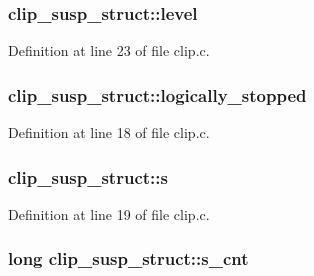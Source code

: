 \subsubsection[{\texorpdfstring{level}{level}}]{ clip\+\_\+susp\+\_\+struct\+::level}\hypertarget{structclip__susp__struct_a6f145bb99356d76153f792440a3794c3}{}\label{structclip__susp__struct_a6f145bb99356d76153f792440a3794c3}


Definition at line 23 of file clip.\+c.

\subsubsection[{\texorpdfstring{logically\+\_\+stopped}{logically_stopped}}]{ clip\+\_\+susp\+\_\+struct\+::logically\+\_\+stopped}\hypertarget{structclip__susp__struct_a777100ae2b579b310ceba48ac325c9b3}{}\label{structclip__susp__struct_a777100ae2b579b310ceba48ac325c9b3}


Definition at line 18 of file clip.\+c.

\subsubsection[{\texorpdfstring{s}{s}}]{ clip\+\_\+susp\+\_\+struct\+::s}\hypertarget{structclip__susp__struct_ac52e61d1e14914a137b1501b59e2c3a1}{}\label{structclip__susp__struct_ac52e61d1e14914a137b1501b59e2c3a1}


Definition at line 19 of file clip.\+c.

\subsubsection[{\texorpdfstring{s\+\_\+cnt}{s_cnt}}]{\setlength{\rightskip}{0pt plus 5cm}long clip\+\_\+susp\+\_\+struct\+::s\+\_\+cnt}\hypertarget{structclip__susp__struct_a03da60faf284bca6b86928b07d4bee36}{}\label{structclip__susp__struct_a03da60faf284bca6b86928b07d4bee36}


